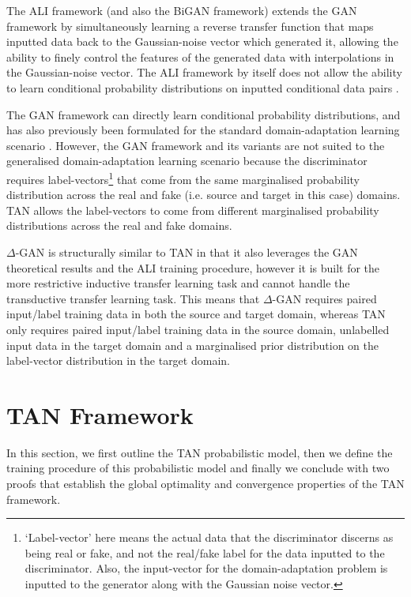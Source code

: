 \documentclass{article}
\begin{document}
The ALI framework (and also the BiGAN framework) extends the GAN framework by simultaneously learning a reverse transfer function that maps inputted data back to the Gaussian-noise vector which generated it, allowing the ability to finely control the features of the generated data with interpolations in the Gaussian-noise vector. The ALI framework by itself does not allow the ability to learn conditional probability distributions on inputted conditional data pairs \cite{arora2017theoretical}. 

The GAN framework can directly learn conditional probability distributions, and has also previously been formulated for the standard domain-adaptation learning scenario \cite{tzeng2017adversarial}. However, the GAN framework and its variants are not suited to the generalised domain-adaptation learning scenario because the discriminator requires label-vectors\footnote{`Label-vector' here means the actual data that the discriminator discerns as being real or fake, and not the real/fake label for the data inputted to the discriminator. Also, the input-vector for the domain-adaptation problem is inputted to the generator along with the Gaussian noise vector.} that come from the same marginalised probability distribution across the real and fake (i.e. source and target in this case) domains. TAN allows the label-vectors to come from different marginalised probability distributions across the real and fake domains.

$\Delta$-GAN \cite{gan2017triangle} is structurally similar to TAN in that it also leverages the GAN theoretical results and the ALI training procedure, however it is built for the more restrictive inductive transfer learning task and cannot handle the transductive transfer learning task. This means that $\Delta$-GAN requires paired input/label training data in both the source and target domain, whereas TAN only requires paired input/label training data in the source domain, unlabelled input data in the target domain and a marginalised prior distribution on the label-vector distribution in the target domain.

\section{TAN Framework}
In this section, we first outline the TAN probabilistic model, then we define the training procedure of this probabilistic model and finally we conclude with two proofs that establish the global optimality and convergence properties of the TAN framework. 
\end{document}
